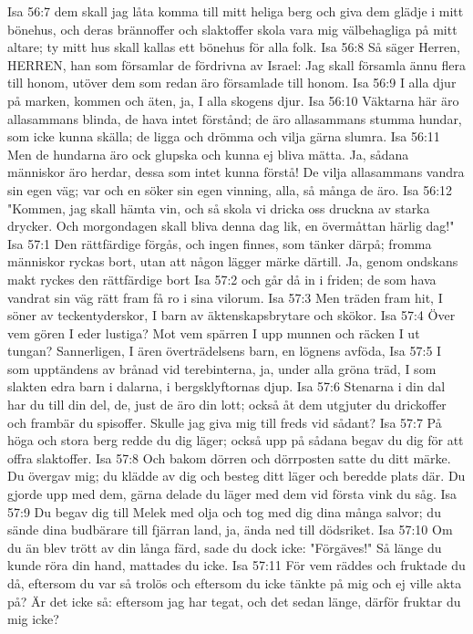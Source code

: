 Isa 56:7  dem skall jag låta komma till mitt heliga berg och giva dem glädje i mitt bönehus, och deras brännoffer och slaktoffer skola vara mig välbehagliga på mitt altare; ty mitt hus skall kallas ett bönehus för alla folk.
Isa 56:8  Så säger Herren, HERREN, han som församlar de fördrivna av Israel: Jag skall församla ännu flera till honom, utöver dem som redan äro församlade till honom.
Isa 56:9  I alla djur på marken, kommen och äten, ja, I alla skogens djur.
Isa 56:10  Väktarna här äro allasammans blinda, de hava intet förstånd; de äro allasammans stumma hundar, som icke kunna skälla; de ligga och drömma och vilja gärna slumra.
Isa 56:11  Men de hundarna äro ock glupska och kunna ej bliva mätta. Ja, sådana människor äro herdar, dessa som intet kunna förstå! De vilja allasammans vandra sin egen väg; var och en söker sin egen vinning, alla, så många de äro.
Isa 56:12  "Kommen, jag skall hämta vin, och så skola vi dricka oss druckna av starka drycker. Och morgondagen skall bliva denna dag lik, en övermåttan härlig dag!"
Isa 57:1  Den rättfärdige förgås, och ingen finnes, som tänker därpå; fromma människor ryckas bort, utan att någon lägger märke därtill. Ja, genom ondskans makt ryckes den rättfärdige bort
Isa 57:2  och går då in i friden; de som hava vandrat sin väg rätt fram få ro i sina vilorum.
Isa 57:3  Men träden fram hit, I söner av teckentyderskor, I barn av äktenskapsbrytare och skökor.
Isa 57:4  Över vem gören I eder lustiga? Mot vem spärren I upp munnen och räcken I ut tungan? Sannerligen, I ären överträdelsens barn, en lögnens avföda,
Isa 57:5  I som upptändens av brånad vid terebinterna, ja, under alla gröna träd, I som slakten edra barn i dalarna, i bergsklyftornas djup.
Isa 57:6  Stenarna i din dal har du till din del, de, just de äro din lott; också åt dem utgjuter du drickoffer och frambär du spisoffer. Skulle jag giva mig till freds vid sådant?
Isa 57:7  På höga och stora berg redde du dig läger; också upp på sådana begav du dig för att offra slaktoffer.
Isa 57:8  Och bakom dörren och dörrposten satte du ditt märke. Du övergav mig; du klädde av dig och besteg ditt läger och beredde plats där. Du gjorde upp med dem, gärna delade du läger med dem vid första vink du såg.
Isa 57:9  Du begav dig till Melek med olja och tog med dig dina många salvor; du sände dina budbärare till fjärran land, ja, ända ned till dödsriket.
Isa 57:10  Om du än blev trött av din långa färd, sade du dock icke: "Förgäves!" Så länge du kunde röra din hand, mattades du icke.
Isa 57:11  För vem räddes och fruktade du då, eftersom du var så trolös och eftersom du icke tänkte på mig och ej ville akta på? Är det icke så: eftersom jag har tegat, och det sedan länge, därför fruktar du mig icke?
